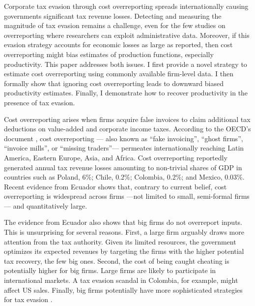 \documentclass[
  12pt]{article}
\theoremstyle{definition}
\theoremstyle{remark}
\begin{document}
Corporate tax evasion through cost overreporting spreads internationally
causing governments significant tax revenue losses. Detecting and
measuring the magnitude of tax evasion remains a challenge, even for the
few studies on overreporting where researchers can exploit
administrative data. Moreover, if this evasion strategy accounts for
economic losses as large as reported, then cost overreporting might bias
estimates of production functions, especially productivity. This paper
addresses both issues. I first provide a novel strategy to estimate cost
overreporting using commonly available firm-level data. I then formally
show that ignoring cost overreporting leads to downward biased
productivity estimates. Finally, I demonstrate how to recover
productivity in the presence of tax evasion.

Cost overreporting arises when firms acquire false invoices to claim
additional tax deductions on value-added and corporate income taxes.
According to the OECD's document \citet{OECD2017}, cost overreporting
--- also known as ``fake invoicing'', ``ghost firms'', ``invoice
mills'', or ``missing traders''--- permeates internationally reaching
Latin America, Eastern Europe, Asia, and Africa. Cost overreporting
reportedly generated annual tax revenue losses amounting to non-trivial
shares of GDP in countries such as Poland, 6\%; Chile, 0.2\%; Colombia,
0.2\%; and Mexico, 0.03\%. Recent evidence from Ecuador
\citep{Carrillo2022} shows that, contrary to current belief, cost
overreporting is widespread across firms ---not limited to small,
semi-formal firms--- and quantitatively large.

The evidence from Ecuador also shows that big firms do not overreport
inputs. This is unsurprising for several reasons. First, a large firm
arguably draws more attention from the tax authority. Given its limited
resources, the government optimizes its expected revenues by targeting
the firms with the higher potential tax recovery, the few big ones.
Second, the cost of being caught cheating is potentially higher for big
firms. Large firms are likely to participate in international markets. A
tax evasion scandal in Colombia, for example, might affect US sales.
Finally, big firms potentially have more sophisticated strategies for
tax evasion \citep[e.g., profit shifting][]{Bustos2022}.
\end{document}
